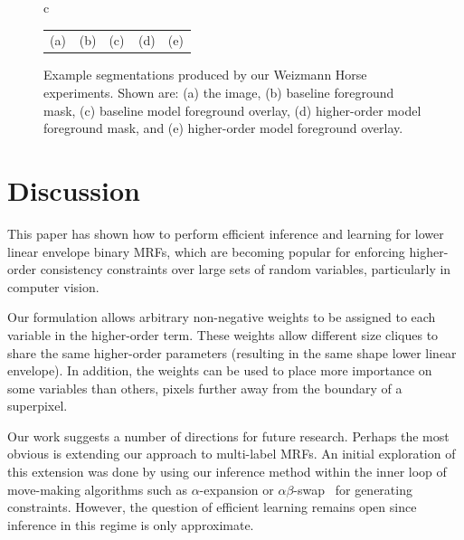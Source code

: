 \documentclass[10pt,journal,letterpaper,compsoc]{IEEEtran}
\renewcommand{\citename}{\citet}
\renewcommand{\cite}{\citep}
\begin{document}
\begin{figure}[t]
\begin{center}
      \begin{tabular}{c}
        \begin{tabular}{p{0.2\linewidth}p{0.2\linewidth}p{0.2\linewidth}p{0.2\linewidth}p{0.2\linewidth}}
          {\small \hspace{5.5mm} (a)} & 
          {\small \hspace{6mm} (b)} &
          {\small \hspace{6mm} (c)} & 
          {\small \hspace{6mm} (d)} &
          {\small \hspace{6mm} (e)}
        \end{tabular}
    \end{tabular}
    \caption{\label{fig:weizmann_results} Example segmentations
      produced by our Weizmann Horse experiments. Shown are: (a) the
      image, (b) baseline foreground mask, (c) baseline model
      foreground overlay, (d) higher-order model foreground mask, and
      (e) higher-order model foreground overlay.}
  \end{center}
\end{figure}


\section{Discussion}
\label{sec:discussion}

This paper has shown how to perform efficient inference and learning
for lower linear envelope binary MRFs, which are becoming popular for
enforcing higher-order consistency constraints over large sets of
random variables, particularly in computer vision.

Our formulation allows arbitrary non-negative weights to be assigned
to each variable in the higher-order term. These weights allow
different size cliques to share the same higher-order parameters
(resulting in the same shape lower linear envelope). In addition, the
weights can be used to place more importance on some variables than
others, \eg pixels further away from the boundary of a superpixel.

Our work suggests a number of directions for future research. Perhaps
the most obvious is extending our approach to multi-label MRFs. An
initial exploration of this extension was done by
\citename{Park:ECCV2012} using our inference method within the inner
loop of move-making algorithms such as $\alpha$-expansion or
$\alpha\beta$-swap~\cite{Boykov:ICCV99} for generating
constraints. However, the question of efficient learning remains open
since inference in this regime is only approximate.
\end{document}
